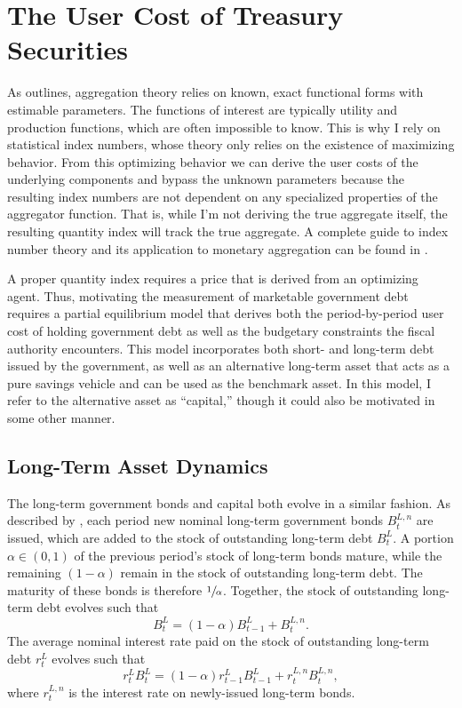 \documentclass[11pt,a4paper,margin=1.5in]{article}
\begin{document}
\section{The User Cost of Treasury Securities}
\label{sec:Theory}
As \citet{Barnett:1980} outlines, aggregation theory relies on known, exact functional forms with estimable parameters.
The functions of interest are typically utility and production functions, which are often impossible to know.
This is why I rely on statistical index numbers, whose theory only relies on the existence of maximizing behavior.
From this optimizing behavior we can derive the user costs of the underlying components and bypass the unknown parameters because the resulting index numbers are not dependent on any specialized properties of the aggregator function.
That is, while I'm not deriving the true aggregate itself, the resulting quantity index will track the true aggregate.
A complete guide to index number theory and its application to monetary aggregation can be found in \citet{Barnett-Serletis:2000}.

A proper quantity index requires a price that is derived from an optimizing agent.
Thus, motivating the measurement of marketable government debt requires a partial equilibrium model that derives both the period-by-period user cost of holding government debt as well as the budgetary constraints the fiscal authority encounters.
This model incorporates both short- and long-term debt issued by the government, as well as an alternative long-term asset that acts as a pure savings vehicle and can be used as the benchmark asset. 
In this model, I refer to the alternative asset as ``capital,'' though it could also be motivated in some other manner. 

\subsection{Long-Term Asset Dynamics}
The long-term government bonds and capital both evolve in a similar fashion.
As described by \citet{Krause-Moyen:2016}, each period new nominal long-term government bonds $B^{L,n}_t$ are issued, which are added to the stock of outstanding long-term debt $B^L_t$.
A portion $\alpha \in (0,1)$ of the previous period's stock of long-term bonds mature, while the remaining $(1-\alpha)$ remain in the stock of outstanding long-term debt. 
The maturity of these bonds is therefore $\sfrac{1}{\alpha}$.
Together, the stock of outstanding long-term debt evolves such that 
\begin{equation}
	B^L_t = (1-\alpha)B^L_{t-1} + B^{L,n}_t.
	\label{eq:LoM_DebtLevel}
\end{equation}
The average nominal interest rate paid on the stock of outstanding long-term debt $r^L_t$ evolves such that
\begin{equation}
	r^L_t B^L_t = (1-\alpha)r^L_{t-1}B^L_{t-1} + r^{L,n}_tB^{L,n}_t,
	\label{eq:LoM_DebtReturn}
\end{equation}
where $r^{L,n}_t$ is the interest rate on newly-issued long-term bonds. 
\end{document}
